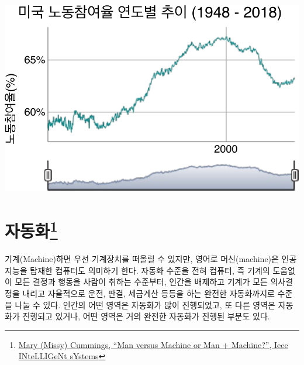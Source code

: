 \documentclass[smallextended]{svjour3}       %
\begin{document}
\begin{center}\includegraphics{paper_files/figure-latex/fred-data-labor-participation-1} \end{center}

\hypertarget{automation-overview}{%
\section[자동화]{\texorpdfstring{자동화\footnote{\href{https://hal.pratt.duke.edu/sites/hal.pratt.duke.edu/files/u10/IS-29-05-Expert\%20Opinion\%5B1\%5D_0.pdf}{Mary
  (Missy) Cummings, ``Man versus Machine or Man + Machine?'', Ieee
  INteLLIGeNt sYstems}}}{자동화}}\label{automation-overview}}

기계(Machine)하면 우선 기계장치를 떠올릴 수 있지만, 영어로
머신(machine)은 인공지능을 탑재한 컴퓨터도 의미하기 한다. 자동화 수준을
전혀 컴퓨터, 즉 기계의 도움없이 모든 결정과 행동을 사람이 취하는
수준부터, 인간을 배제하고 기계가 모든 의사결정을 내리고 자율적으로 운전,
판결, 세금계산 등등을 하는 완전한 자동화까지로 수준을 나눌 수 있다.
인간의 어떤 영역은 자동화가 많이 진행되었고, 또 다른 영역은 자동화가
진행되고 있거나, 어떤 영역은 거의 완전한 자동화가 진행된 부분도 있다.
\end{document}
